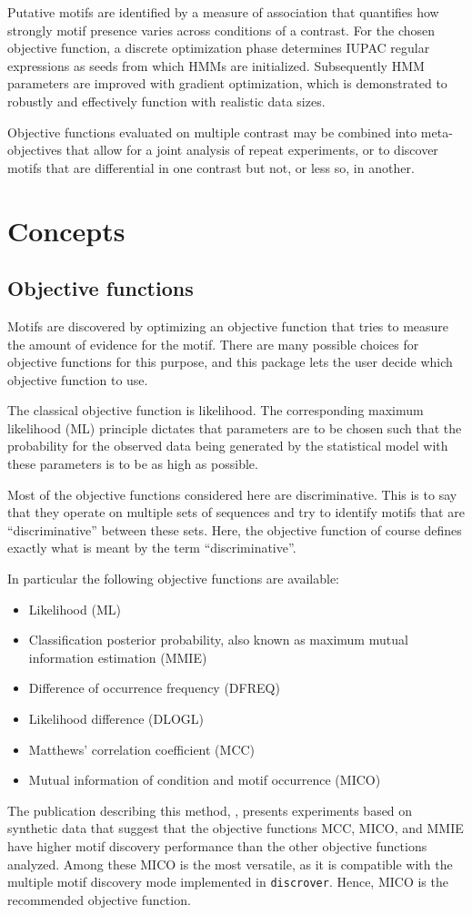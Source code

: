 \documentclass[a4paper]{article}
\newcommand{\discrover}[0]{\texttt{discrover}}
\begin{document}
Putative motifs are identified by a measure of association that quantifies how strongly motif presence varies across conditions of a contrast.
For the chosen objective function, a discrete optimization phase determines IUPAC regular expressions as seeds from which HMMs are initialized.
Subsequently HMM parameters are improved with gradient optimization, which is demonstrated to robustly and effectively function with realistic data sizes.

Objective functions evaluated on multiple contrast may be combined into meta-objectives that allow for a joint analysis of repeat experiments, or to discover motifs that are differential in one contrast but not, or less so, in another.

\section{Concepts}
\subsection{Objective functions}
Motifs are discovered by optimizing an objective function that tries to measure the amount of evidence for the motif.
There are many possible choices for objective functions for this purpose, and this package lets the user decide which objective function to use.

The classical objective function is likelihood.
The corresponding maximum likelihood (ML) principle dictates that parameters are to be chosen such that the probability for the observed data being generated by the statistical model with these parameters is to be as high as possible.

Most of the objective functions considered here are discriminative.
This is to say that they operate on multiple sets of sequences and try to identify motifs that are ``discriminative'' between these sets.
Here, the objective function of course defines exactly what is meant by the term ``discriminative''.

In particular the following objective functions are available:
\begin{itemize}
  \item Likelihood (ML)
  \item Classification posterior probability, also known as maximum mutual information estimation (MMIE)
  \item Difference of occurrence frequency (DFREQ)
  \item Likelihood difference (DLOGL)
  \item Matthews' correlation coefficient (MCC)
  \item Mutual information of condition and motif occurrence (MICO)
\end{itemize}
The publication describing this method, \cite{Maaskola2014}, presents experiments based on synthetic data that suggest that the objective functions MCC, MICO, and MMIE have higher motif discovery performance than the other objective functions analyzed.
Among these MICO is the most versatile, as it is compatible with the multiple motif discovery mode implemented in \discrover{}.
Hence, MICO is the recommended objective function.
\end{document}
